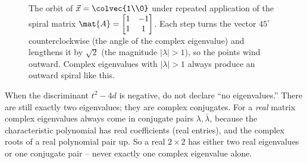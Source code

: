 \begin{figure}[H]
\centering
{}
\caption{The orbit of $\vec{x}=\protect\colvec{1\\0}$ under repeated application of
the spiral matrix $\mat{A}=\protect\begin{bmatrix}1&-1\\1&1\protect\end{bmatrix}$.
Each step turns the vector $45^\circ$ counterclockwise (the angle of the complex
eigenvalue) and lengthens it by $\sqrt2$ (the magnitude $|\lambda|>1$), so the
points wind outward. Complex eigenvalues with $|\lambda|>1$ always produce an
outward spiral like this.}
\label{ch23:fig-spiral}
\end{figure}

\begin{trapbox}
When the discriminant $t^2-4d$ is negative, do not declare ``no eigenvalues.''
There are still exactly two eigenvalues; they are complex conjugates. For a
\emph{real} matrix complex eigenvalues always come in conjugate pairs
$\lambda,\bar\lambda$, because the characteristic polynomial has real coefficients
(real entries), and the complex roots of a real polynomial pair up. So a real
$2\times 2$ has either two real eigenvalues or one conjugate pair -- never exactly
one complex eigenvalue alone.
\end{trapbox}

